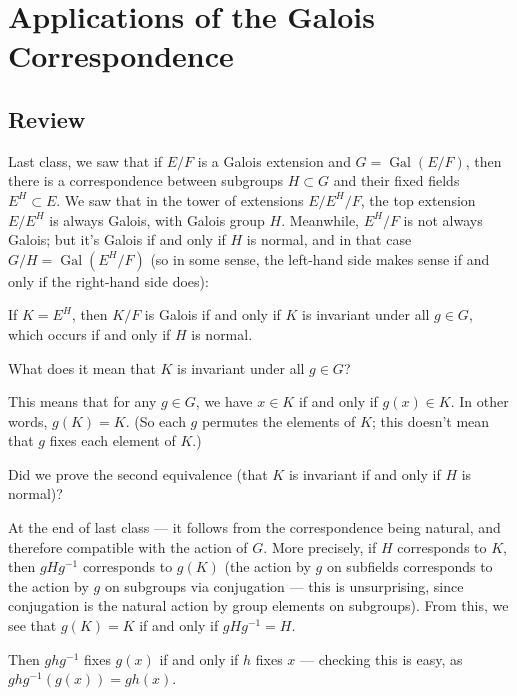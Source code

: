 

\section{Applications of the Galois Correspondence}

\subsection{Review}

Last class, we saw that if $E/F$ is a Galois extension and $G = \operatorname{Gal}(E/F)$, then there is a correspondence between subgroups $H \subset G$ and their fixed fields $E^H \subset E$. We saw that in the tower of extensions $E/E^H/F$, the top extension $E/E^H$ is always Galois, with Galois group $H$. Meanwhile, $E^H/F$ is not always Galois; but it's Galois if and only if $H$ is normal, and in that case $G/H = \operatorname{Gal}(E^H/F)$ (so in some sense, the left-hand side  makes sense if and only if the right-hand side does):

\begin{proposition}
If $K = E^H$, then $K/F$ is Galois if and only if $K$ is invariant under all $g \in G$, which occurs if and only if $H$ is normal. 
\end{proposition}

\begin{question}
    What does it mean that $K$ is invariant under all $g \in G$?
\end{question}

\begin{ans}
This means that for any $g \in G$, we have $x \in K$ if and only if $g(x) \in K$. In other words, $g(K) = K$. (So each $g$ permutes the elements of $K$; this doesn't mean that $g$ fixes each element of $K$.)
\end{ans}

\begin{question}
    Did we prove the second equivalence (that $K$ is invariant if and only if $H$ is normal)?
\end{question}

\begin{ans}
At the end of last class --- it follows from the correspondence being natural, and therefore compatible with the action of $G$. More precisely, if $H$ corresponds to $K$, then $gHg^{-1}$ corresponds to $g(K)$ (the action by $g$ on subfields corresponds to the action by $g$ on subgroups via conjugation --- this is unsurprising, since conjugation is the natural action by group elements on subgroups). From this, we see that $g(K) = K$ if and only if $gHg^{-1} = H$. 

Then $ghg^{-1}$ fixes $g(x)$ if and only if $h$ fixes $x$ --- checking this is easy, as $ghg^{-1}(g(x)) = gh(x)$. 
\end{ans}

